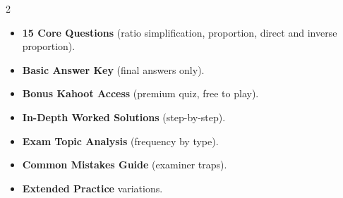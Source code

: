 \documentclass[11pt,a4paper]{article}
\newcommand{\FullReleaseDate}{April 30, 2026}
\begin{document}
\vspace{8pt}

\begin{multicols}{2}
  \begin{tcolorbox}[card, title=\sffamily\bfseries\textcolor{white}{\faHandPointDown\ TODAY (Simplified Version)}, colbacktitle=mainblue, boxed title style={sharp corners, boxrule=0pt}]
    \begin{itemize}[leftmargin=1.2em, itemsep=2pt]
      \item \small \textbf{15 Core Questions} (ratio simplification, proportion, direct and inverse proportion).
      \item \small \textbf{Basic Answer Key} (final answers only).
      \item \small \textbf{Bonus Kahoot Access} (premium quiz, free to play).
    \end{itemize}
  \end{tcolorbox}

  \columnbreak

  \begin{tcolorbox}[card, title=\sffamily\bfseries\textcolor{white}{\faRocket\ ON \FullReleaseDate\ (Full Upgrade)}, colbacktitle=mainblue, boxed title style={sharp corners, boxrule=0pt}]
    \begin{itemize}[leftmargin=1.2em, itemsep=2pt]
      \item \small \textbf{In-Depth Worked Solutions} (step-by-step).
      \item \small \textbf{Exam Topic Analysis} (frequency by type).
      \item \small \textbf{Common Mistakes Guide} (examiner traps).
      \item \small \textbf{Extended Practice} variations.
    \end{itemize}
  \end{tcolorbox}
\end{multicols}
\end{document}
